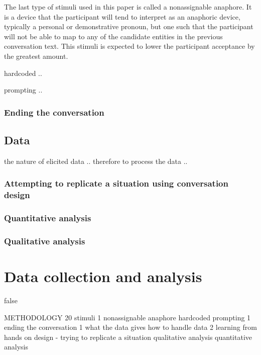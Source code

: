 \documentclass[12pt]{report}
\begin{document}
{The last type of stimuli used in this paper
is called a nonassignable anaphore.
It is a device that the participant will tend to
interpret as an anaphoric device,
typically a personal or demonstrative pronoun,
but one such that the participant will not be able
to map to any of the candidate entities
in the previous conversation text.
This stimuli is expected to lower the participant acceptance
by the greatest amount.

\par
hardcoded ..

\par
prompting ..

\subsection{Ending the conversation}

\section{Data}

\par
the nature of elicited data ..
therefore to process the data ..

\subsection{Attempting to replicate a situation using conversation design}

\subsection{Quantitative analysis}

\subsection{Qualitative analysis}



\chapter{Data collection and analysis}


\if false

METHODOLOGY 20
		stimuli
	1		nonassignable anaphore
				hardcoded
				prompting
	1	ending the conversation
	1   what the data gives
	       how to handle data
	2 learning from
	    hands on design - trying to replicate a situation
		qualitative analysis
		quantitative analysis

}
\end{document}
